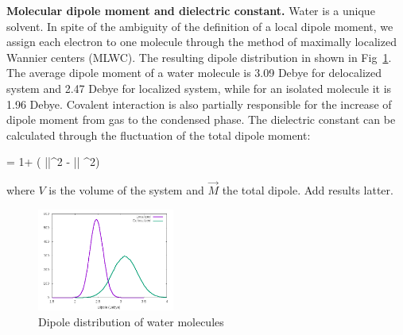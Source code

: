 \documentclass[prl,twocolumn,showpacs]{revtex4}
\begin{document}
\textbf{Molecular dipole moment and dielectric constant.} Water is a unique solvent. In spite of the ambiguity of the definition of a local dipole moment, we assign each electron to one molecule through the method of maximally localized Wannier centers (MLWC). The resulting dipole distribution in shown in Fig~\ref{Fig:dipoledist}. The average dipole moment of a water molecule is 3.09 Debye for delocalized system and 2.47 Debye for localized system, while for an isolated molecule it is 1.96 Debye. \new Covalent interaction is also partially responsible for the increase of dipole moment from gas to the condensed phase. \old The dielectric constant can be calculated through the fluctuation of the total dipole moment\cite{neumann1983dipole,adams1981theory}:

\bea
\epsilon = 1+  (  \langle ||^2 \rangle  - \langle || \rangle ^2) \label{Eq:dielectric}
\eea

where $V$ is the volume of the system and $\vec{M}$ the total dipole. \new Add results latter.\old

\begin{figure}
\includegraphics[width=0.4\textwidth]{dipole_dist}
\caption{Dipole distribution of water molecules} \label{Fig:dipoledist}
\end{figure}
\end{document}
